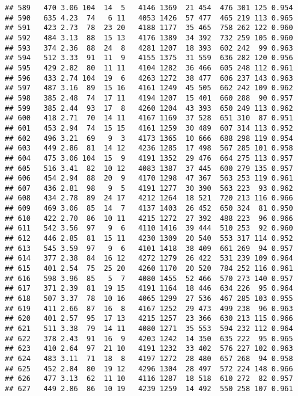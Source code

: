 \documentclass[]{article}
\begin{document}
\begin{verbatim}
## 589   470 3.06 104  14  5   4146 1369  21 454  476 301 125 0.954
## 590   635 4.23  74   6 11   4053 1426  57 477  465 219 113 0.965
## 591   423 2.73  78  23 20   4188 1177  35 465  758 262 122 0.960
## 592   484 3.13  88  15 13   4176 1389  34 392  732 259 105 0.960
## 593   374 2.36  88  24  8   4281 1207  18 393  602 242  99 0.963
## 594   512 3.33  91  11  9   4155 1375  31 559  636 282 120 0.956
## 595   429 2.82  80  11 11   4104 1282  36 466  605 248 112 0.961
## 596   433 2.74 104  19  6   4263 1272  38 477  606 237 143 0.963
## 597   487 3.16  89  15 16   4161 1249  45 505  662 242 109 0.962
## 598   385 2.48  74  17 11   4194 1207  15 401  660 288  90 0.957
## 599   385 2.44  93  17  8   4260 1204  43 393  650 249 113 0.962
## 600   418 2.71  70  14 11   4167 1169  37 528  651 310  87 0.951
## 601   453 2.94  74  15 15   4161 1259  30 489  607 314 113 0.952
## 602   496 3.21  69   9  3   4173 1365  10 666  688 298 119 0.954
## 603   449 2.86  81  14 12   4236 1285  17 498  567 285 101 0.958
## 604   475 3.06 104  15  9   4191 1352  29 476  664 275 113 0.957
## 605   516 3.41  82  10 12   4083 1387  37 445  600 279 135 0.957
## 606   454 2.94  88  20  9   4170 1298  47 367  563 253 119 0.961
## 607   436 2.81  98   9  5   4191 1277  30 390  563 223  93 0.962
## 608   434 2.78  89  24 17   4212 1264  18 521  720 213 116 0.966
## 609   469 3.06  85  14  7   4137 1403  26 452  650 324  81 0.950
## 610   422 2.70  86  10 11   4215 1272  27 392  488 223  96 0.966
## 611   542 3.56  97   9  6   4110 1416  39 444  510 253  92 0.960
## 612   446 2.85  81  15 11   4230 1309  20 540  553 317 114 0.952
## 613   545 3.59  97   9  6   4101 1418  38 409  661 269  94 0.957
## 614   377 2.38  84  16 12   4272 1279  26 422  531 239 109 0.964
## 615   401 2.54  75  25 20   4260 1170  20 520  784 252 116 0.961
## 616   598 3.96  85   5  7   4080 1455  52 466  570 273 140 0.957
## 617   371 2.39  81  19 15   4191 1164  18 446  634 226  95 0.964
## 618   507 3.37  78  10 16   4065 1299  27 536  467 285 103 0.955
## 619   411 2.66  87  16  8   4167 1252  29 473  499 238  96 0.963
## 620   401 2.57  95  17 13   4215 1257  23 366  630 213 115 0.966
## 621   511 3.38  79  14 11   4080 1271  35 553  594 232 112 0.964
## 622   378 2.43  91  16  9   4203 1242  14 350  635 222  95 0.965
## 623   410 2.64  97  21 10   4191 1232  33 402  576 227 102 0.963
## 624   483 3.11  71  18  8   4197 1272  28 480  657 268  94 0.958
## 625   452 2.84  80  19 12   4296 1304  28 497  572 224 148 0.966
## 626   477 3.13  62  11 10   4116 1287  18 518  610 272  82 0.957
## 627   449 2.86  86  10 19   4239 1259  14 492  550 258 107 0.961

\end{verbatim}
\end{document}
